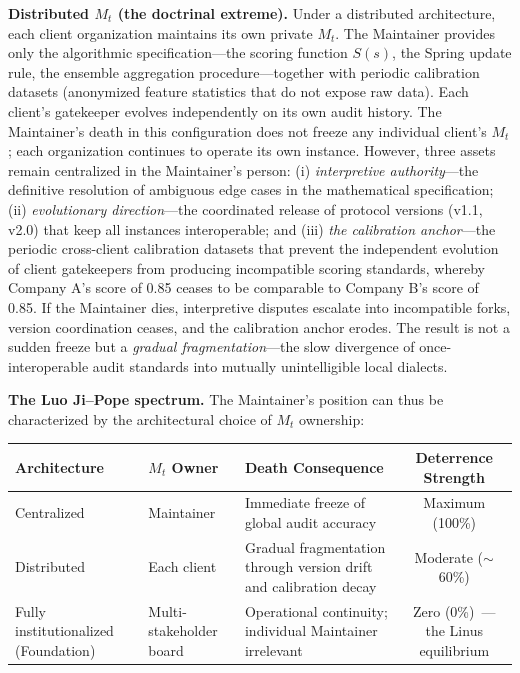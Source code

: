 \documentclass[12pt,a4paper]{article}
\theoremstyle{definition}
\theoremstyle{remark}
\begin{document}
\textbf{Distributed $M_t$ (the doctrinal extreme).} Under a distributed architecture, each client organization maintains its own private $M_t$. The Maintainer provides only the algorithmic specification—the scoring function $S(s)$, the Spring update rule, the ensemble aggregation procedure—together with periodic calibration datasets (anonymized feature statistics that do not expose raw data). Each client's gatekeeper evolves independently on its own audit history. The Maintainer's death in this configuration does not freeze any individual client's $M_t$; each organization continues to operate its own instance. However, three assets remain centralized in the Maintainer's person: (i) \textit{interpretive authority}—the definitive resolution of ambiguous edge cases in the mathematical specification; (ii) \textit{evolutionary direction}—the coordinated release of protocol versions (v1.1, v2.0) that keep all instances interoperable; and (iii) \textit{the calibration anchor}—the periodic cross-client calibration datasets that prevent the independent evolution of client gatekeepers from producing incompatible scoring standards, whereby Company A's score of 0.85 ceases to be comparable to Company B's score of 0.85. If the Maintainer dies, interpretive disputes escalate into incompatible forks, version coordination ceases, and the calibration anchor erodes. The result is not a sudden freeze but a \textit{gradual fragmentation}—the slow divergence of once-interoperable audit standards into mutually unintelligible local dialects.

\textbf{The Luo Ji–Pope spectrum.} The Maintainer's position can thus be characterized by the architectural choice of $M_t$ ownership:

\begin{table}[htbp]
\centering
\begin{tabular}{@{}p{3cm}p{3cm}p{4cm}c@{}}
\toprule
Architecture & $M_t$ Owner & Death Consequence & Deterrence Strength \\
\midrule
Centralized & Maintainer & Immediate freeze of global audit accuracy & Maximum (100\%) \\
Distributed & Each client & Gradual fragmentation through version drift and calibration decay & Moderate ($\sim$60\%) \\
Fully institutionalized (Foundation) & Multi-stakeholder board & Operational continuity; individual Maintainer irrelevant & Zero (0\%)\ — the Linus equilibrium \\
\bottomrule
\end{tabular}
\end{table}
\end{document}
